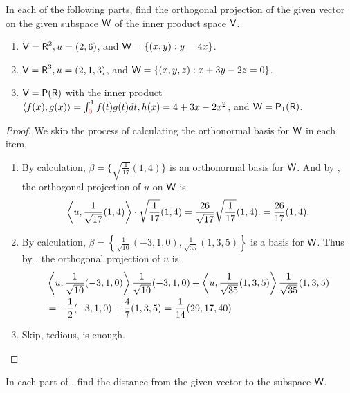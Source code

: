 \begin{exercise} \label{exercise 6.2.19}
In each of the following parts, find the orthogonal projection of the given vector on the given subspace \(\textsf{W}\) of the inner product space \(\textsf{V}\).
\begin{enumerate}
\item \(\textsf{V} = \textsf{R}^2, u = (2, 6)\), and \(\textsf{W} = \{ (x, y): y = 4x \}\).
\item \(\textsf{V} = \textsf{R}^3, u = (2, 1, 3)\), and \(\textsf{W} = \{ (x, y, z): x + 3y - 2z = 0 \}\).
\item \(\textsf{V} = \textsf{P}(\textsf{R})\) with the inner product \(\LG f(x), g(x) \RG = \int_{\RED{0}}^1 f(t) g(t) dt, h(x) = 4 + 3x - 2x^2\), and \(\textsf{W} = \textsf{P}_1(\textsf{R})\).
\end{enumerate}
\end{exercise}

\begin{proof}
We skip the process of calculating the orthonormal basis for \(\textsf{W}\) in each item.
\begin{enumerate}
\item By calculation, \(\beta = \{ \sqrt{\frac{1}{17}} (1, 4) \}\) is an orthonormal basis for \(\textsf{W}\).
And by , the orthogonal projection of \(u\) on \(\textsf{W}\) is
\[
    \left< u, \frac{1}{\sqrt{17}} (1, 4) \right> \cdot \sqrt{\frac{1}{17}} (1, 4) = \frac{26}{\sqrt{17}} \sqrt{\frac{1}{17}} (1, 4). = \frac{26}{17} (1, 4).
\]

\item By calculation, \(\beta =  \left\{ \frac{1}{\sqrt{10}}(-3,1,0), \frac{1}{\sqrt{35}}(1,3,5) \right\}\) is a basis for \(\textsf{W}\).
Thus by , the orthogonal projection of \(u\) is
\begin{align*}
    & \left< u, \frac{1}{\sqrt{10}}(-3,1,0)\right> \frac{1}{\sqrt{10}}(-3,1,0)
    + \left< u, \frac{1}{\sqrt{35}}(1,3,5)\right> \frac{1}{\sqrt{35}}(1,3,5) \\
    & = -\frac{1}{2}(-3,1,0) + \frac{4}{7}(1,3,5) = \frac{1}{14}(29,17,40)
\end{align*}

\item Skip, tedious,  is enough.
\end{enumerate}
\end{proof}

\begin{exercise} \label{exercise 6.2.20}
In each part of , find the distance from the given vector to the subspace \(\textsf{W}\).
\end{exercise}

